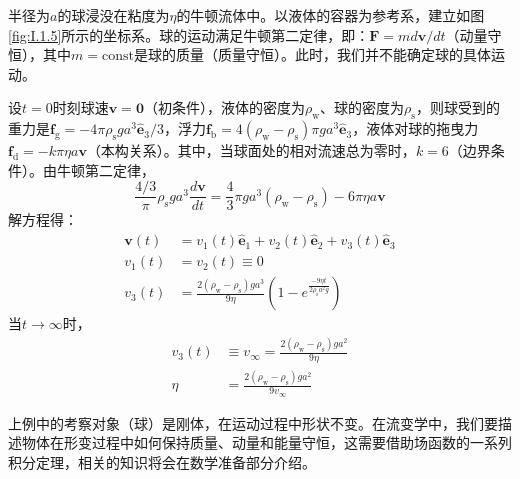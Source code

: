 \documentclass[main.tex]{subfiles}
\begin{document}
\begin{example}[落球粘度计]\label{exp:I.1.5}
    半径为$a$的球浸没在粘度为$\eta$的牛顿流体中。以液体的容器为参考系，建立如图\ref{fig:I.1.5}所示的坐标系。球的运动满足牛顿第二定律，即：$\mathbf{F}=md\mathbf{v}/dt$（动量守恒），其中$m=\mathrm{const}$是球的质量（质量守恒）。此时，我们并不能确定球的具体运动。

    设$t=0$时刻球速$\mathbf{v}=\mathbf{0}$（初条件），液体的密度为$\rho_\mathrm{w}$、球的密度为$\rho_\mathrm{s}$，则球受到的重力是$\mathbf{f}_\mathrm{g}=-4\pi\rho_\mathrm{s}ga^3\mathbf{\hat{e}}_3/3$，浮力$\mathbf{f}_\mathrm{b}=4\left(\rho_\mathrm{w}-\rho_\mathrm{s}\right)\pi ga^3\mathbf{\hat{e}}_3$，液体对球的拖曳力$\mathbf{f}_\mathrm{d}=-k\pi\eta a\mathbf{v}$（本构关系）。其中，当球面处的相对流速总为零时，$k=6$（边界条件）。由牛顿第二定律，
    \[
        \frac{4/3}\pi\rho_\mathrm{s}ga^3\frac{d\mathbf{v}}{dt}=\frac{4}{3}\pi ga^3\left(\rho_\mathrm{w}-\rho_\mathrm{s}\right)-6\pi\eta a\mathbf{v}
    \]
    解方程得：
    \begin{align*}
        \mathbf{v}\left(t\right) & =v_1\left(t\right)\mathbf{\hat{e}}_1+v_2\left(t\right)\mathbf{\hat{e}}_2+v_3\left(t\right)\mathbf{\hat{e}}_3             \\
        v_1\left(t\right)        & =v_2\left(t\right)\equiv0                                                                                                \\
        v_3\left(t\right)        & =\frac{2\left(\rho_\mathrm{w}-\rho_\mathrm{s}\right)ga^3}{9\eta}\left(1-e^{\frac{-9\eta t}{2\rho_\mathrm{s}a^2g}}\right)
    \end{align*}
    当$t\rightarrow\infty$时，
    \begin{align*}
        v_3\left(t\right) & \equiv v_\infty= \frac{2\left(\rho_\mathrm{w}-\rho_\mathrm{s}\right)ga^2}{9\eta} \\
        \eta              & =\frac{2\left(\rho_\mathrm{w}-\rho_\mathrm{s}\right)ga^2}{9v_\infty}
    \end{align*}
\end{example}

上例中的考察对象（球）是刚体，在运动过程中形状不变。在流变学中，我们要描述物体在形变过程中如何保持质量、动量和能量守恒，这需要借助场函数的一系列积分定理，相关的知识将会在数学准备部分介绍。
\end{document}
